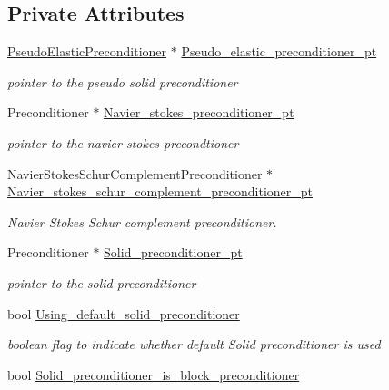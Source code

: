 \subsection*{Private Attributes}
\begin{DoxyCompactItemize}
\item 
\hyperlink{classoomph_1_1PseudoElasticPreconditioner}{Pseudo\+Elastic\+Preconditioner} $\ast$ \hyperlink{classoomph_1_1PseudoElasticFSIPreconditioner_afad4b204e6b7b2a63e4c4e0fe2f9f2c0}{Pseudo\+\_\+elastic\+\_\+preconditioner\+\_\+pt}
\begin{DoxyCompactList}\small\item\em pointer to the pseudo solid preconditioner \end{DoxyCompactList}\item 
Preconditioner $\ast$ \hyperlink{classoomph_1_1PseudoElasticFSIPreconditioner_a5314b4734298c3de8f394a45792ba1c9}{Navier\+\_\+stokes\+\_\+preconditioner\+\_\+pt}
\begin{DoxyCompactList}\small\item\em pointer to the navier stokes precondtioner \end{DoxyCompactList}\item 
Navier\+Stokes\+Schur\+Complement\+Preconditioner $\ast$ \hyperlink{classoomph_1_1PseudoElasticFSIPreconditioner_a438b2a5932c1fde633a73107043f0b09}{Navier\+\_\+stokes\+\_\+schur\+\_\+complement\+\_\+preconditioner\+\_\+pt}
\begin{DoxyCompactList}\small\item\em Navier Stokes Schur complement preconditioner. \end{DoxyCompactList}\item 
Preconditioner $\ast$ \hyperlink{classoomph_1_1PseudoElasticFSIPreconditioner_a2d96e724939038637ff4911372ee69b4}{Solid\+\_\+preconditioner\+\_\+pt}
\begin{DoxyCompactList}\small\item\em pointer to the solid preconditioner \end{DoxyCompactList}\item 
bool \hyperlink{classoomph_1_1PseudoElasticFSIPreconditioner_aab116f252418ca092f7e6f0f75de6778}{Using\+\_\+default\+\_\+solid\+\_\+preconditioner}
\begin{DoxyCompactList}\small\item\em boolean flag to indicate whether default Solid preconditioner is used \end{DoxyCompactList}\item 
bool \hyperlink{classoomph_1_1PseudoElasticFSIPreconditioner_aa58001a8248ecac64087de254c0ae763}{Solid\+\_\+preconditioner\+\_\+is\+\_\+block\+\_\+preconditioner}

\end{DoxyCompactItemize}
